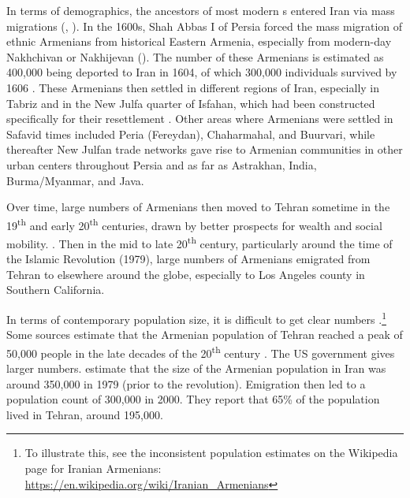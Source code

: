 In terms of demographics, the ancestors of most  modern {\iaIA}s entered Iran via mass migrations (\citealt[19]{Kouymjian-1997-ArmeniaFromCiliciaShah}, \citealt[3]{Hovhannisian-2021-ArmenianCommunityPersianIranIntro}). In the 1600s, Shah Abbas I of Persia forced the mass migration of ethnic Armenians from historical Eastern Armenia, especially  from modern-day Nakhchivan or Nakhijevan (). The number of these Armenians is estimated as 400,000 being deported to Iran in 1604, of  which 300,000 individuals survived by 1606 \citep[314]{Ghougassian-2021-ArmenianRuralSettlementNewJulfa}.   These Armenians then settled in different regions of Iran, especially in Tabriz and in the New Julfa quarter of Isfahan, which had been constructed specifically for their resettlement \citep[9]{Hovhannisian-2021-ArmenianCommunityPersianIranIntro}. Other areas where Armenians were settled in Safavid times included Peria (Fereydan), Chaharmahal, and Buurvari, while thereafter New Julfan trade networks gave rise to Armenian communities in other urban centers throughout Persia and as far as Astrakhan, India, Burma/Myanmar, and Java. 

Over time, large numbers of Armenians then moved to Tehran sometime in the 19\textsuperscript{th} and early 20\textsuperscript{th} centuries,  drawn by better prospects for wealth and social mobility. \citep[6]{Hovhannisian-2021-ArmenianCommunityPersianIranIntro}. Then in the mid to late 20\textsuperscript{th} century, particularly around the time of the Islamic Revolution (1979), large numbers of Armenians emigrated from Tehran to elsewhere around the globe, especially to   Los Angeles county in Southern California. 

In terms of contemporary population size, it is difficult to get clear numbers \citep{Iskandaryan-2019-ArmeniancommunityIranIssuesEMigration}.\footnote{To illustrate this, see the inconsistent population estimates on the Wikipedia page for Iranian Armenians: {\url{https://en.wikipedia.org/wiki/Iranian_Armenians}}}  Some sources estimate that the Armenian population of Tehran reached a peak of 50,000 people in the late decades of the 20\textsuperscript{th} century \citep[6]{Hovhannisian-2021-ArmenianCommunityPersianIranIntro}.  The US government gives larger numbers. \citet[101]{CurtisHooglund-2008-IranCountryStudy}  estimate  that   the size of the Armenian population in Iran was around 350,000 in 1979 (prior to the revolution). Emigration then led to a population count of 300,000 in 2000. They report that   65\% of the population lived in Tehran, around 195,000. 

